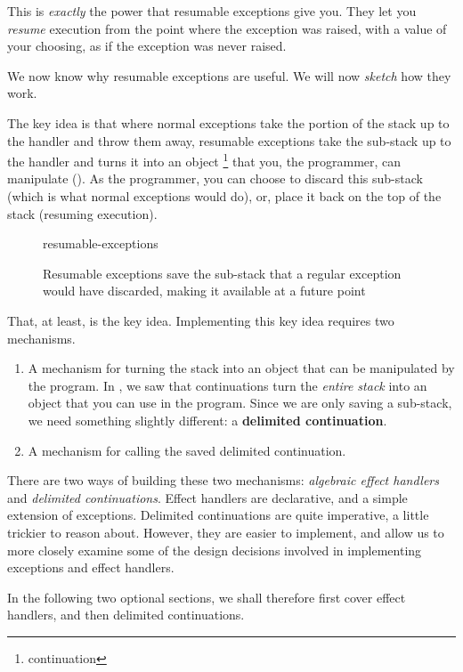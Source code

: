 This is \textit{exactly} the power that resumable exceptions give you. They let you \textit{resume} execution from the point where the exception was raised, with a value of your choosing, as if the exception was never raised. 

We now know why resumable exceptions are useful. We will now \textit{sketch} how they work. 

The key idea is that where normal exceptions take the portion of the stack up to the handler and throw them away, resumable exceptions take the sub-stack up to the handler and turns it into an object \footnote{continuation} that you, the programmer, can manipulate (). As the programmer, you can choose to discard this sub-stack (which is what normal exceptions would do), or, place it back on the top of the stack (resuming execution). 

\begin{figure}
    \centering
    {resumable-exceptions}
    \caption{Resumable exceptions save the sub-stack that a regular exception would have discarded, making it available at a future point}
    \label{fig:resumable-exception-sketch}
\end{figure}

That, at least, is the key idea. Implementing this key idea requires two mechanisms.

\begin{enumerate}
    \item A mechanism for turning the stack into an object that can be manipulated by the program. In , we saw that continuations turn the \textit{entire stack} into an object that you can use in the program. Since we are only saving a sub-stack, we need something slightly different: a \textbf{delimited continuation}. 
    \item A mechanism for calling the saved delimited continuation.
\end{enumerate}

There are two ways of building these two mechanisms: \textit{algebraic effect handlers} and \textit{delimited continuations}. Effect handlers are declarative, and a simple extension of exceptions. Delimited continuations are quite imperative, a little trickier to reason about. However, they are easier to implement, and allow us to more closely examine some of the design decisions involved in implementing exceptions and effect handlers. 

In the following two optional sections, we shall therefore first cover effect handlers, and then delimited continuations.

